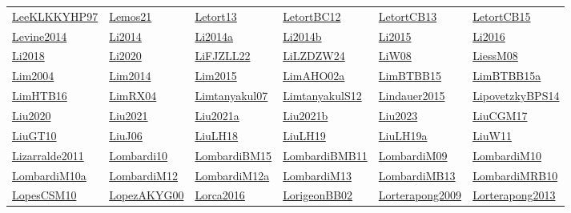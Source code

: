 \begin{longtable}{*{6}{l}}
\hyperref[detail:LeeKLKKYHP97]{LeeKLKKYHP97} & \hyperref[detail:Lemos21]{Lemos21} & \hyperref[detail:Letort13]{Letort13} & \hyperref[detail:LetortBC12]{LetortBC12} & \hyperref[detail:LetortCB13]{LetortCB13} & \hyperref[detail:LetortCB15]{LetortCB15}\\ 
\hyperref[detail:Levine2014]{Levine2014} & \hyperref[detail:Li2014]{Li2014} & \hyperref[detail:Li2014a]{Li2014a} & \hyperref[detail:Li2014b]{Li2014b} & \hyperref[detail:Li2015]{Li2015} & \hyperref[detail:Li2016]{Li2016}\\ 
\hyperref[detail:Li2018]{Li2018} & \hyperref[detail:Li2020]{Li2020} & \hyperref[detail:LiFJZLL22]{LiFJZLL22} & \hyperref[detail:LiLZDZW24]{LiLZDZW24} & \hyperref[detail:LiW08]{LiW08} & \hyperref[detail:LiessM08]{LiessM08}\\ 
\hyperref[detail:Lim2004]{Lim2004} & \hyperref[detail:Lim2014]{Lim2014} & \hyperref[detail:Lim2015]{Lim2015} & \hyperref[detail:LimAHO02a]{LimAHO02a} & \hyperref[detail:LimBTBB15]{LimBTBB15} & \hyperref[detail:LimBTBB15a]{LimBTBB15a}\\ 
\hyperref[detail:LimHTB16]{LimHTB16} & \hyperref[detail:LimRX04]{LimRX04} & \hyperref[detail:Limtanyakul07]{Limtanyakul07} & \hyperref[detail:LimtanyakulS12]{LimtanyakulS12} & \hyperref[detail:Lindauer2015]{Lindauer2015} & \hyperref[detail:LipovetzkyBPS14]{LipovetzkyBPS14}\\ 
\hyperref[detail:Liu2020]{Liu2020} & \hyperref[detail:Liu2021]{Liu2021} & \hyperref[detail:Liu2021a]{Liu2021a} & \hyperref[detail:Liu2021b]{Liu2021b} & \hyperref[detail:Liu2023]{Liu2023} & \hyperref[detail:LiuCGM17]{LiuCGM17}\\ 
\hyperref[detail:LiuGT10]{LiuGT10} & \hyperref[detail:LiuJ06]{LiuJ06} & \hyperref[detail:LiuLH18]{LiuLH18} & \hyperref[detail:LiuLH19]{LiuLH19} & \hyperref[detail:LiuLH19a]{LiuLH19a} & \hyperref[detail:LiuW11]{LiuW11}\\ 
\hyperref[detail:Lizarralde2011]{Lizarralde2011} & \hyperref[detail:Lombardi10]{Lombardi10} & \hyperref[detail:LombardiBM15]{LombardiBM15} & \hyperref[detail:LombardiBMB11]{LombardiBMB11} & \hyperref[detail:LombardiM09]{LombardiM09} & \hyperref[detail:LombardiM10]{LombardiM10}\\ 
\hyperref[detail:LombardiM10a]{LombardiM10a} & \hyperref[detail:LombardiM12]{LombardiM12} & \hyperref[detail:LombardiM12a]{LombardiM12a} & \hyperref[detail:LombardiM13]{LombardiM13} & \hyperref[detail:LombardiMB13]{LombardiMB13} & \hyperref[detail:LombardiMRB10]{LombardiMRB10}\\ 
\hyperref[detail:LopesCSM10]{LopesCSM10} & \hyperref[detail:LopezAKYG00]{LopezAKYG00} & \hyperref[detail:Lorca2016]{Lorca2016} & \hyperref[detail:LorigeonBB02]{LorigeonBB02} & \hyperref[detail:Lorterapong2009]{Lorterapong2009} & \hyperref[detail:Lorterapong2013]{Lorterapong2013}\\ 

\end{longtable}
